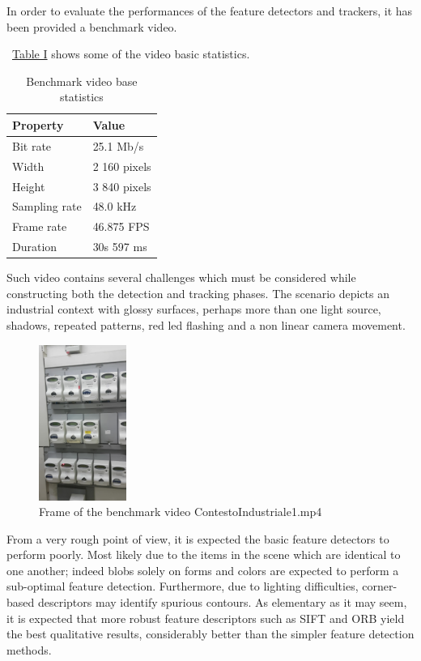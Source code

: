 \documentclass[journal]{IEEEtran}
\begin{document}
In order to evaluate the performances of the feature detectors and trackers, it has been provided a benchmark video.

~\hyperref[tab:video]{Table I} shows some of the video basic statistics.

\begin{table}[h]
\centering
\caption{Benchmark video base statistics}
\label{tab:video}
\setlength\tabcolsep{0pt}
\begin{tabular*}{0.6\columnwidth}{@{\extracolsep{\fill}}ll}
\toprule
    Property & Value \\ 
\midrule
    Bit rate & 25.1 Mb/s \\
    Width & 2 160 pixels \\
    Height & 3 840 pixels \\
    Sampling rate & 48.0 kHz \\
    Frame rate & 46.875 FPS \\
    Duration & 30s 597 ms \\
\bottomrule
\end{tabular*}
\end{table}

Such video contains several challenges which must be considered while constructing both the detection and tracking phases. The scenario depicts an industrial context with glossy surfaces, perhaps more than one light source, shadows, repeated patterns, red led flashing and a non linear camera movement. 

\begin{figure}
    \centering
    \includegraphics[height=2in]{images/contesto_industriale.jpg}
    \caption{Frame of the benchmark video ContestoIndustriale1.mp4}
    \label{fig:contestoindustriale}
\end{figure}

From a very rough point of view, it is expected the basic feature detectors to perform poorly. 
Most likely due to the items in the scene which are identical to one another; indeed blobs solely on forms and colors are expected to perform a sub-optimal feature detection. Furthermore, due to lighting difficulties, corner-based descriptors may identify spurious contours. As elementary as it may seem, it is expected that more robust feature descriptors such as SIFT and ORB yield the best qualitative results, considerably better than the simpler feature detection methods.
\end{document}
